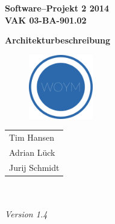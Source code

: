 \documentclass[fontsize=12pt,paper=a4,twoside]{scrartcl}
\begin{document}
  \thispagestyle{fancy}
  \fancyhead[LO,RE]{ }
  \fancyfoot[C]{}

  \vspace{3cm}

  \begin{minipage}[H]{\textwidth}
  \begin{center}
  \bf
  \Large
  Software--Projekt 2 2014\\
  \smallskip
  \small
  VAK 03-BA-901.02\\
  \vspace{3cm}
  \end{center}
  \end{minipage}
  \begin{minipage}[H]{\textwidth}
  \begin{center}
  \vspace{1cm}
  \bf
  \Large Architekturbeschreibung\\
  \vspace{3ex}
   	  \begin{figure}[H]
      \centering
      \includegraphics[width=0.25\textwidth]{../WOYM.png}
      \end{figure}
  \vfill
  \end{center}
  \end{minipage}
  \vfill
  \begin{minipage}[H]{\textwidth}
  \begin{center}
  \sf
  \begin{tabular}{l}
  Tim Hansen \\
  Adrian Lück \\
  Jurij Schmidt\\
  \end{tabular}
  \\ ~
  \vspace{2cm}
  \\
  \it Version 1.4\\ ~
  \end{center}
  \end{minipage}
\end{document}
